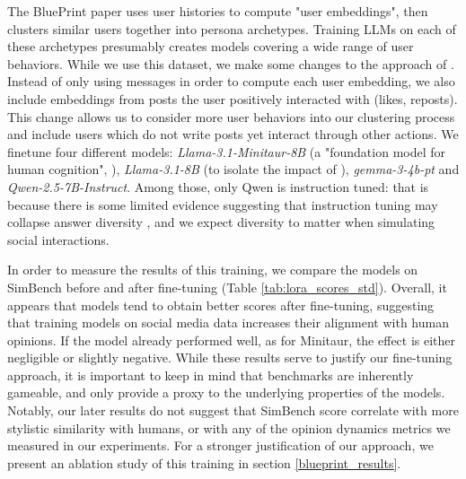 \documentclass{article} %
\begin{document}
The BluePrint paper uses user histories to compute "user embeddings", then clusters similar users together into persona archetypes. Training LLMs on each of these archetypes presumably creates models covering a wide range of user behaviors. While we use this dataset, we make some changes to the approach of \cite{bückkaeffer2025textttblueprintsocialmediauser}. Instead of only using messages in order to compute each user embedding, we also include embeddings from posts the user positively interacted with (likes, reposts). This change allows us to consider more user behaviors into our clustering process and include users which do not write posts yet interact through other actions. We finetune four different models: \textit{Llama-3.1-Minitaur-8B} (a "foundation model for human cognition", \cite{binz2024centaurfoundationmodelhuman}), \textit{Llama-3.1-8B} (to isolate the impact of \cite{binz2024centaurfoundationmodelhuman}), \textit{gemma-3-4b-pt} and \textit{Qwen-2.5-7B-Instruct}. Among those, only Qwen is instruction tuned: that is because there is some limited evidence suggesting that instruction tuning may collapse answer diversity \citep{shypuladoes}, and we expect diversity to matter when simulating social interactions.

In order to measure the results of this training, we compare the models on SimBench \citep{hu2025simbenchbenchmarkingabilitylarge} before and after fine-tuning (Table \ref{tab:lora_scores_std}). Overall, it appears that models tend to obtain better scores after fine-tuning, suggesting that training models on social media data increases their alignment with human opinions. If the model already performed well, as for Minitaur, the effect is either negligible or slightly negative. While these results serve to justify our fine-tuning approach, it is important to keep in mind that benchmarks are inherently gameable, and only provide a proxy to the underlying properties of the models. Notably, our later results do not suggest that SimBench score correlate with more stylistic similarity with humans, or with any of the opinion dynamics metrics we measured in our experiments. For a stronger justification of our approach, we present an ablation study of this training in section \ref{blueprint_results}.
\end{document}
